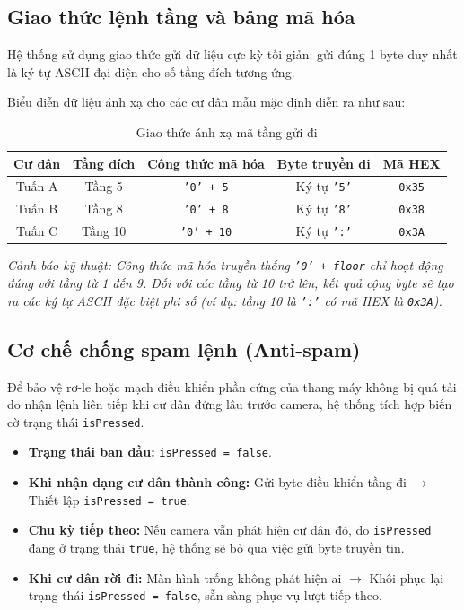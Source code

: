 \documentclass[12pt,a4paper]{article}
\begin{document}
\subsection{Giao thức lệnh tầng và bảng mã hóa}
Hệ thống sử dụng giao thức gửi dữ liệu cực kỳ tối giản: gửi đúng 1 byte duy nhất là ký tự ASCII đại diện cho số tầng đích tương ứng. 

Biểu diễn dữ liệu ánh xạ cho các cư dân mẫu mặc định diễn ra như sau:
\begin{table}[H]
    \centering
    \begin{tabular}{|c|c|c|c|c|}
        \hline
        \textbf{Cư dân} & \textbf{Tầng đích} & \textbf{Công thức mã hóa} & \textbf{Byte truyền đi} & \textbf{Mã HEX} \\ \hline
        Tuấn A & Tầng 5 & \texttt{'0' + 5} & Ký tự \texttt{'5'} & \texttt{0x35} \\ \hline
        Tuấn B & Tầng 8 & \texttt{'0' + 8} & Ký tự \texttt{'8'} & \texttt{0x38} \\ \hline
        Tuấn C & Tầng 10 & \texttt{'0' + 10} & Ký tự \texttt{':'} & \texttt{0x3A} \\ \hline
    \end{tabular}
    \caption{Giao thức ánh xạ mã tầng gửi đi}
    \label{tab:protocol_mapping}
\end{table}

\textit{Cảnh báo kỹ thuật: Công thức mã hóa truyền thống \texttt{'0' + floor} chỉ hoạt động đúng với tầng từ 1 đến 9. Đối với các tầng từ 10 trở lên, kết quả cộng byte sẽ tạo ra các ký tự ASCII đặc biệt phi số (ví dụ: tầng 10 là \texttt{':'} có mã HEX là \texttt{0x3A}).}

\subsection{Cơ chế chống spam lệnh (Anti-spam)}
Để bảo vệ rơ-le hoặc mạch điều khiển phần cứng của thang máy không bị quá tải do nhận lệnh liên tiếp khi cư dân đứng lâu trước camera, hệ thống tích hợp biến cờ trạng thái \texttt{isPressed}.
\begin{itemize}
    \item \textbf{Trạng thái ban đầu:} \texttt{isPressed = false}.
    \item \textbf{Khi nhận dạng cư dân thành công:} Gửi byte điều khiển tầng đi $\rightarrow$ Thiết lập \texttt{isPressed = true}.
    \item \textbf{Chu kỳ tiếp theo:} Nếu camera vẫn phát hiện cư dân đó, do \texttt{isPressed} đang ở trạng thái \texttt{true}, hệ thống sẽ bỏ qua việc gửi byte truyền tin.
    \item \textbf{Khi cư dân rời đi:} Màn hình trống không phát hiện ai $\rightarrow$ Khôi phục lại trạng thái \texttt{isPressed = false}, sẵn sàng phục vụ lượt tiếp theo.
\end{itemize}
\end{document}
